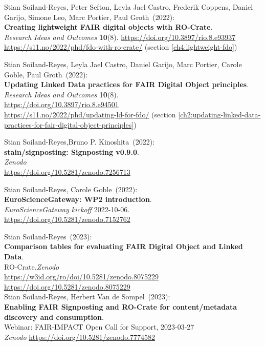 \begin{thebibliography}{9}
Stian Soiland-Reyes, Peter Sefton, Leyla Jael Castro, Frederik Coppens,
Daniel Garijo, Simone Leo, Marc Portier, Paul Groth~(2022): \\
\textbf{Creating lightweight FAIR digital objects with RO-Crate}.\\
\emph{Research Ideas and Outcomes} \textbf{10}(8).
\url{https://doi.org/10.3897/rio.8.e93937} \\
\url{https://s11.no/2022/phd/fdo-with-ro-crate/}
(section \vref{ch4:lightweight-fdo})

Stian Soiland-Reyes, Leyla Jael Castro, Daniel Garijo, Marc Portier,
Carole Goble, Paul Groth~(2022): \\
\textbf{Updating Linked Data practices for FAIR Digital Object principles}. \\
\emph{Research Ideas and Outcomes} \textbf{10}(8).\\
\url{https://doi.org/10.3897/rio.8.e94501}\\
\url{https://s11.no/2022/phd/updating-ld-for-fdo/} (section \vref{ch2:updating-linked-data-practices-for-fair-digital-object-principles})

Stian Soiland-Reyes,Bruno P. Kinoshita~(2022): \\
\textbf{stain/signposting: Signposting v0.9.0}.\\
\emph{Zenodo}\\
\url{https://doi.org/10.5281/zenodo.7256713}

Stian Soiland-Reyes, Carole Goble~(2022): \\
\textbf{EuroScienceGateway: WP2 introduction}.\\
\emph{EuroScienceGateway kickoff} 2022-10-06.\\
\url{https://doi.org/10.5281/zenodo.7152762}

Stian Soiland-Reyes~(2023): \\
\textbf{Comparison tables for evaluating FAIR Digital Object and Linked Data}.\\
RO-Crate.\emph{Zenodo}\\
\url{https://w3id.org/ro/doi/10.5281/zenodo.8075229}\\
\url{https://doi.org/10.5281/zenodo.8075229}\\

Stian Soiland-Reyes, Herbert Van de Sompel~(2023): \\
\textbf{Enabling FAIR Signposting and RO-Crate for content/metadata discovery and consumption}.\\
Webinar: FAIR-IMPACT Open Call for Support, 2023-03-27 \\
\emph{Zenodo}
\url{https://doi.org/10.5281/zenodo.7774582}


\end{thebibliography}
